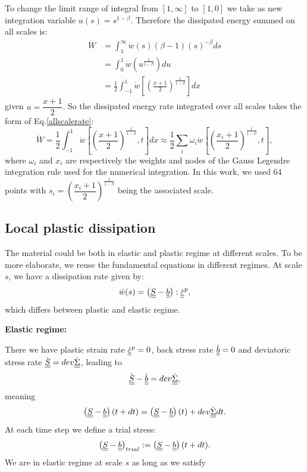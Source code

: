 \noindent
To change the limit range of integral from $[1,\infty]$ to $[1,0]$ we take as new integration variable
$u(s)= s^{1-\beta}$. Therefore the dissipated energy summed on all scales is:
\begin{equation}
\begin{split}
\dot{W}&=\int_{1}^{\infty}\dot{w}(s) (\beta-1)(s)^{-\beta}ds
\\&=\int_{0}^{1}\dot{w}\left( u^{\frac{1}{1-\beta}}\right)du
\\&=\frac{1}{2}\int_{-1}^{1}\dot{w}\left[  \left( \frac{x+1}{2}\right) ^{\frac{1}{1-\beta}}\right] dx
\end{split}
\label{allscale}
\end{equation}
given $u=\dfrac{x+1}{2}$. So the dissipated energy rate integrated over all scales takes the form of Eq.\eqref{allscalerate}:
\begin{equation}
\dot{W}=\frac{1}{2}\int_{-1}^{1}\dot{w}\left[  \left( \frac{x+1}{2}\right) ^{\frac{1}{1-\beta}},t\right] dx\approx\frac{1}{2}\sum_{i}\omega_i\dot{w}\left[  \left( \frac{x_i+1}{2}\right) ^{\frac{1}{1-\beta}},t\right],
\label{allscalerate}
\end{equation}
where $\omega_i$ and $x_i$ are respectively the weights and nodes of the Gauss Legendre integration rule used for the numerical integration.  In this work, we used 64 points\cite{legendre} with $s_i=\left( \dfrac{x_i+1}{2}\right) ^{\frac{1}{1-\beta}}$ being the associated scale.

\subsection{Local plastic dissipation}
The material could be both in elastic and plastic regime at different scales. To be more elaborate, we reuse the fundamental equations in different regimes. At scale $s$, we have a dissipation rate given by:
$$\dot{w}(s)=\left( \uline{\uline{S}}-\uline{\uline{b}}\right):\dot{\uline{\uline{\varepsilon}}}^p, $$
which differs between plastic and elastic regime.

\vspace{6pt}
\noindent
\textbf{Elastic regime:}

\vspace{6pt}
\noindent
There we have
plastic strain rate
$\dot{\uline{\uline{\varepsilon}}}^p=0$, back stress rate $\dot{\uline{\uline{b}}}=0$ and deviatoric stress rate $\dot{\uline{\uline{S}}}=dev\dot{\uline{\uline{\Sigma}}}$, leading to
$$\dot{\uline{\uline{S}}}-\dot{\uline{\uline{b}}}=dev\dot{\uline{\uline{\Sigma}}},$$ 
meaning
$$\left( \uline{\uline{S}}-\uline{\uline{b}}\right) (t+dt)=\left( \uline{\uline{S}}-\uline{\uline{b}}\right) (t)+dev\dot{\uline{\uline{\Sigma}}}dt.$$
At each time step we define a trial stress:
\begin{equation}
\left( \uline{\uline{S}}-\uline{\uline{b}}\right)_{trial}:=\left( \uline{\uline{S}}-\uline{\uline{b}}\right)(t+dt).
\label{trial}
\end{equation}
We are in elastic regime at scale $s$ as long as we satisfy

